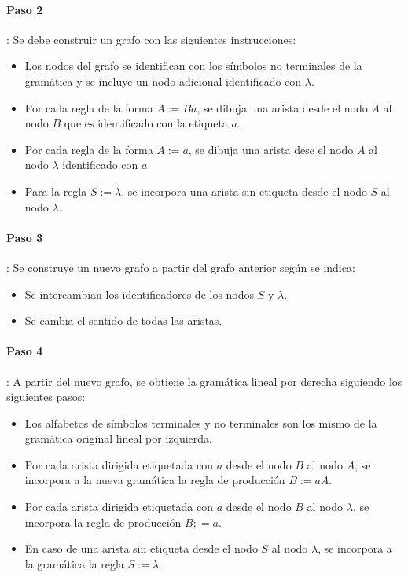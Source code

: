 \documentclass[12pt]{article}
\begin{document}
\paragraph{Paso 2}\mbox{}: Se debe construir un grafo con las siguientes instrucciones:
\begin{itemize}
  \item Los nodos del grafo se identifican con los símbolos no terminales de la gramática y se incluye un nodo adicional identificado con $ \lambda $.

  \item Por cada regla de la forma $ A:=Ba $, se dibuja una arista desde el nodo $ A $ al nodo $ B $ que es identificado con la etiqueta $ a $.

  \item Por cada regla de la forma $ A:=a $, se dibuja una arista dese el nodo $ A $ al nodo $ \lambda $ identificado con $ a $.

  \item Para la regla $ S:=\lambda $, se incorpora una arista sin etiqueta desde el nodo $ S $ al nodo $ \lambda $.
\end{itemize}

\paragraph{Paso 3}\mbox{}: Se construye un nuevo grafo a partir del grafo anterior según se indica:
\begin{itemize}
  \item Se intercambian los identificadores de los nodos $ S $ y $ \lambda $.

  \item Se cambia el sentido de todas las aristas.
\end{itemize}

\paragraph{Paso 4}\mbox{}: A partir del nuevo grafo, se obtiene la gramática lineal por derecha siguiendo los siguientes pasos:
\begin{itemize}
  \item Los alfabetos de símbolos terminales y no terminales son los mismo de la gramática original lineal por izquierda.

  \item Por cada arista dirigida etiquetada con $ a $ desde el nodo $ B $ al nodo $ A $, se incorpora a la nueva gramática la regla de producción $ B:=aA $.

  \item Por cada arista dirigida etiquetada con $ a $ desde el nodo $ B $ al nodo $ \lambda $, se incorpora la regla de producción $ B;=a $.

  \item En caso de una arista sin etiqueta desde el nodo $ S $ al nodo $ \lambda $, se incorpora a la gramática la regla $ S:=\lambda $.
\end{itemize}
\end{document}

